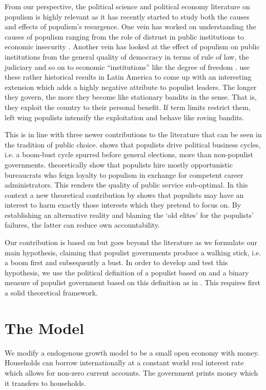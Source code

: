 \documentclass{OUP-EJ}
\begin{document}
From our perspective, the political science and political economy literature on populism is highly relevant as it has recently started to study both the causes and effects of populism’s resurgence. One vein has worked on understanding the causes of populism ranging from the role of distrust in public institutions \cite{Doyle2011} to economic insecurity \cite{FunkeEtAl2016}.  Another vein has looked at the effect of populism on public institutions from the general quality of democracy in terms of rule of law, the judiciary and so on to economic “institutions” like the degree of freedom \cite{HouleKenny2016}. \cite{BastosEtAl2023} use these rather historical results in Latin America to come up with an interesting extension which adds a highly negative attribute to populist leaders. The longer they govern, the more they become like stationary bandits in the \cite{Olson1993} sense. That is, they exploit the country to their personal benefit. If term limits restrict them, left wing populists intensify the exploitation and behave like roving bandits. 

This is in line with three newer contributions to the literature that can be seen in the tradition of public choice. \cite{Shmuel2025} shows that populists drive political business cycles, i.e. a boom-bust cycle spurred before general elections, more than non-populist governments. \cite{SassoEtAl2021} theoretically show that populists hire mostly opportunistic bureaucrats who feign loyalty to populism in exchange for competent career administrators. This renders the quality of public service sub-optimal. In this context a new theoretical contribution by \cite{SzeidlSzucs2025} shows that populists may have an interest to harm exactly those interests which they pretend to focus on. By establishing an alternative reality and blaming the ‘old elites’ for the populists’ failures, the latter can reduce own accountability.

Our contribution is based on but goes beyond the literature as we formulate our main hypothesis, claiming that populist governments produce a walking stick, i.e. a boom first and subsequently a bust. In order to develop and test this hypothesis, we use the political definition of a populist based on \cite{Kaltwasser2018} and a binary measure of populist government based on this definition as in \cite{FunkeEtAl2023}.   This requires first a solid theoretical framework.

\section{The Model}
We modify a \cite{Romer1990} endogenous growth model to be a small open economy with money. Households can borrow internationally at a constant world real interest rate which allows for non-zero current accounts. The government prints money which it transfers to households. 
\end{document}
